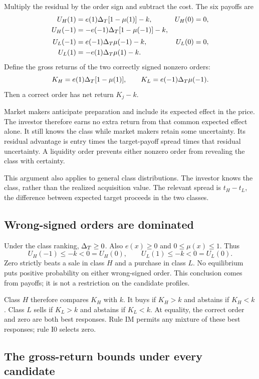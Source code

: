 Multiply the residual by the order sign and subtract the cost.
The six payoffs are
\begin{align*}
U_H(1)&=e(1)\Delta_T[1-\mu(1)]-k,& U_H(0)&=0,\\
U_H(-1)&=-e(-1)\Delta_T[1-\mu(-1)]-k,\\[2pt]
U_L(-1)&=e(-1)\Delta_T\mu(-1)-k,& U_L(0)&=0,\\
U_L(1)&=-e(1)\Delta_T\mu(1)-k.
\end{align*}
Define the gross returns of the two correctly signed nonzero orders:
\[
K_H=e(1)\Delta_T[1-\mu(1)],\qquad
K_L=e(-1)\Delta_T\mu(-1).
\]
Then a correct order has net return $K_j-k$.

\begin{intuition}
Market makers anticipate preparation and include its expected effect in the price.
The investor therefore earns no extra return from that common expected effect alone.
It still knows the class while market makers retain some uncertainty.
Its residual advantage is entry times the target-payoff spread times that residual uncertainty.
A liquidity order prevents either nonzero order from revealing the class with certainty.
\end{intuition}

This argument also applies to general class distributions.
The investor knows the class, rather than the realized acquisition value.
The relevant spread is $t_H-t_L$, the difference between expected target proceeds in the two classes.

\subsection{Wrong-signed orders are dominated}
\label{sec:05_investor-sign}

Under the class ranking, $\Delta_T\ge0$.
Also $e(x)\ge0$ and $0\le\mu(x)\le1$.
Thus
\[
U_H(-1)\le-k<0=U_H(0),\qquad
U_L(1)\le-k<0=U_L(0).
\]
Zero strictly beats a sale in class $H$ and a purchase in class $L$.
No equilibrium puts positive probability on either wrong-signed order.
This conclusion comes from payoffs; it is not a restriction on the candidate profiles.

Class $H$ therefore compares $K_H$ with $k$.
It buys if $K_H>k$ and abstains if $K_H<k$.
Class $L$ sells if $K_L>k$ and abstains if $K_L<k$.
At equality, the correct order and zero are both best responses.
Rule IM permits any mixture of these best responses; rule I0 selects zero.

\subsection{The gross-return bounds under every candidate}
\label{sec:05_investor-bounds}

